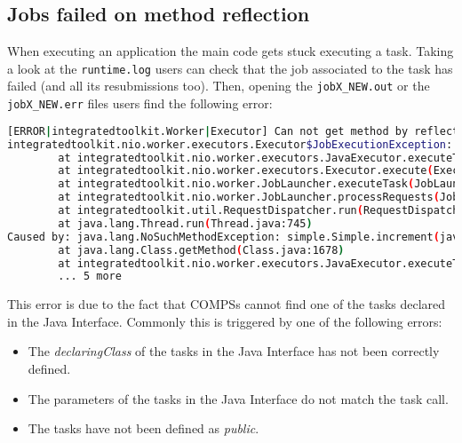 
\subsection{Jobs failed on method reflection}
When executing an application the main code gets stuck executing a task. Taking a look at the \texttt{runtime.log} users can check
that the job associated to the task has failed (and all its resubmissions too). Then, opening the \texttt{jobX\_NEW.out} or the
\texttt{jobX\_NEW.err} files users find the following error:

\begin{lstlisting}[language=bash]
[ERROR|integratedtoolkit.Worker|Executor] Can not get method by reflection
integratedtoolkit.nio.worker.executors.Executor$JobExecutionException: Can not get method by reflection
        at integratedtoolkit.nio.worker.executors.JavaExecutor.executeTask(JavaExecutor.java:142)
        at integratedtoolkit.nio.worker.executors.Executor.execute(Executor.java:42)
        at integratedtoolkit.nio.worker.JobLauncher.executeTask(JobLauncher.java:46)
        at integratedtoolkit.nio.worker.JobLauncher.processRequests(JobLauncher.java:34)
        at integratedtoolkit.util.RequestDispatcher.run(RequestDispatcher.java:46)
        at java.lang.Thread.run(Thread.java:745)
Caused by: java.lang.NoSuchMethodException: simple.Simple.increment(java.lang.String)
        at java.lang.Class.getMethod(Class.java:1678)
        at integratedtoolkit.nio.worker.executors.JavaExecutor.executeTask(JavaExecutor.java:140)
        ... 5 more
\end{lstlisting}

This error is due to the fact that COMPSs cannot find one of the tasks declared in the Java Interface. Commonly this is triggered by
one of the following errors:

\begin{itemize}
 \item The \textit{declaringClass} of the tasks in the Java Interface has not been correctly defined.
 \item The parameters of the tasks in the Java Interface do not match the task call.
 \item The tasks have not been defined as \textit{public}.
\end{itemize}

